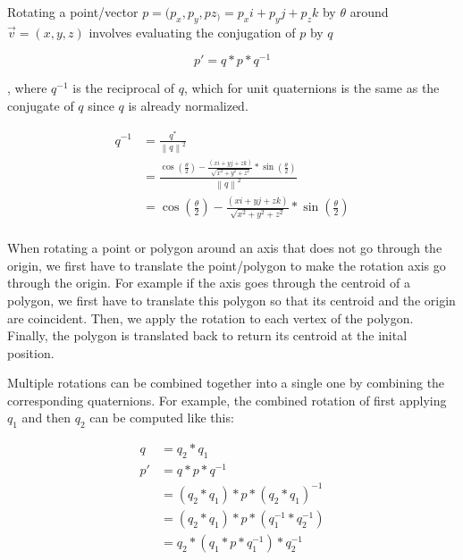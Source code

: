 		Rotating a point/vector \( p = (p_x, p_y, pz_) = p_xi + p_yj + p_zk \) by \( \theta \) around \( \vec{v} = (x, y, z) \) involves evaluating the conjugation of \( p \) by \( q \) 
		
		\begin{equation}
			p' = q*p*q^{-1}
		\end{equation}
		
		, where \( q^{-1} \) is the reciprocal of \( q \), which for unit quaternions is the same as the conjugate of \( q \) since \( q \) is already normalized.
		
		\begin{equation}
		\begin{split}
			q^{-1} & = \frac{q^{\ast}}{{\left \| q \right \|}^2} \\
					& = \frac{\cos(\frac{\theta}{2}) - \frac{(xi + yj + zk)}{\sqrt{x^2 + y^2 + z^2}}*\sin(\frac{\theta}{2})}{{\left \| q \right \|}^2} \\
					& = \cos(\frac{\theta}{2}) - \frac{(xi + yj + zk)}{\sqrt{x^2 + y^2 + z^2}}*\sin(\frac{\theta}{2}) \\
		\end{split}
		\end{equation}
		
		When rotating a point or polygon around an axis that does not go through the origin, we first have to translate the point/polygon to make the rotation axis go through the origin. For example if the axis goes through the centroid of a polygon, we first have to translate this polygon so that its centroid and the origin are coincident. Then, we apply the rotation to each vertex of the polygon. Finally, the polygon is translated back to return its centroid at the inital position.
		
		Multiple rotations can be combined together into a single one by combining the corresponding quaternions. For example, the combined rotation of first applying \( q_1 \) and then \( q_2 \) can be computed like this:
		
		\begin{equation}
		\begin{split}
			q 	& = q_2*q_1 \\
			p' 	& = q*p*q^{-1} \\
				& = (q_2*q_1)*p*(q_2*q_1)^{-1} \\
				& =  (q_2*q_1)*p*(q_1^{-1}*q_2^{-1}) \\
				& = q_2*(q_1*p*q_1^{-1})*q_2^{-1} \\
		\end{split}
		\end{equation}
		
